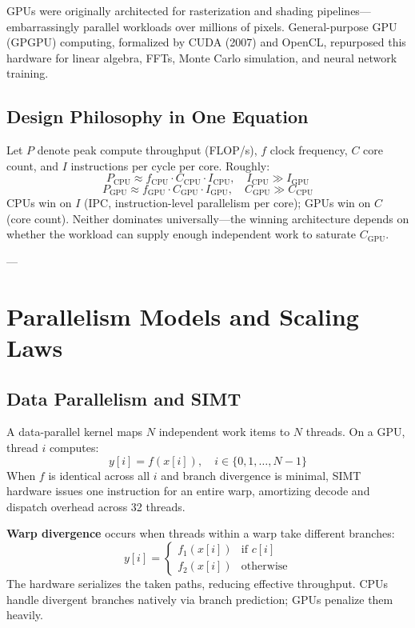 \documentclass[11pt,journal,onecolumn]{IEEEtran}
\begin{document}
GPUs were originally architected for rasterization and shading pipelines---embarrassingly parallel workloads over millions of pixels. General-purpose GPU (GPGPU) computing, formalized by CUDA (2007) and OpenCL, repurposed this hardware for linear algebra, FFTs, Monte Carlo simulation, and neural network training.

\subsection{Design Philosophy in One Equation}
Let $P$ denote peak compute throughput (FLOP/s), $f$ clock frequency, $C$ core count, and $I$ instructions per cycle per core. Roughly:
\begin{equation}
P_{\mathrm{CPU}} \approx f_{\mathrm{CPU}} \cdot C_{\mathrm{CPU}} \cdot I_{\mathrm{CPU}}, \quad I_{\mathrm{CPU}} \gg I_{\mathrm{GPU}}
\end{equation}
\begin{equation}
P_{\mathrm{GPU}} \approx f_{\mathrm{GPU}} \cdot C_{\mathrm{GPU}} \cdot I_{\mathrm{GPU}}, \quad C_{\mathrm{GPU}} \gg C_{\mathrm{CPU}}
\end{equation}
CPUs win on $I$ (IPC, instruction-level parallelism per core); GPUs win on $C$ (core count). Neither dominates universally---the winning architecture depends on whether the workload can supply enough independent work to saturate $C_{\mathrm{GPU}}$.

---

\section{Parallelism Models and Scaling Laws}

\subsection{Data Parallelism and SIMT}
A data-parallel kernel maps $N$ independent work items to $N$ threads. On a GPU, thread $i$ computes:
\begin{equation}
y[i] = f(x[i]), \quad i \in \{0, 1, \ldots, N-1\}
\end{equation}
When $f$ is identical across all $i$ and branch divergence is minimal, SIMT hardware issues one instruction for an entire warp, amortizing decode and dispatch overhead across 32 threads.

\textbf{Warp divergence} occurs when threads within a warp take different branches:
\begin{equation}
y[i] = \begin{cases} f_1(x[i]) & \text{if } c[i] \\ f_2(x[i]) & \text{otherwise} \end{cases}
\end{equation}
The hardware serializes the taken paths, reducing effective throughput. CPUs handle divergent branches natively via branch prediction; GPUs penalize them heavily.
\end{document}
